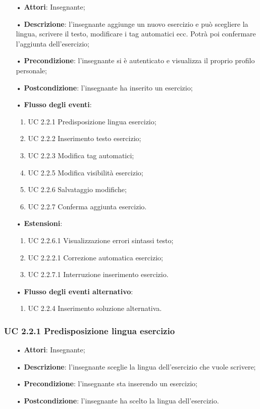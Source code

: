 \begin{itemize}
	\item[•] \textbf{Attori}: Insegnante;
	\item[•] \textbf{Descrizione}: l'insegnante aggiunge un nuovo esercizio e può scegliere la lingua, scrivere il testo,
modificare i tag automatici ecc. Potrà poi confermare l'aggiunta dell'esercizio;
	\item[•] \textbf{Precondizione}: l'insegnante si è autenticato e visualizza il proprio profilo personale;
	\item[•] \textbf{Postcondizione}: l'insegnante ha inserito un esercizio;
	\item[•] \textbf{Flusso degli eventi}:
	\begin{enumerate}
		\item UC 2.2.1 Predisposizione lingua esercizio;
		\item UC 2.2.2 Inserimento testo esercizio;
		\item UC 2.2.3 Modifica tag automatici;

		\item UC 2.2.5 Modifica visibilità esercizio;
		\item UC 2.2.6 Salvataggio modifiche;
		\item UC 2.2.7 Conferma aggiunta esercizio.
	\end{enumerate}
	\item[•] \textbf{Estensioni}:	
	\begin{enumerate}
		\item UC 2.2.6.1 Visualizzazione errori sintassi testo;
		\item UC 2.2.2.1 Correzione automatica esercizio;
		\item UC 2.2.7.1 Interruzione inserimento esercizio.
	\end{enumerate}
	\item[•] \textbf{Flusso degli eventi alternativo}:
	\begin{enumerate}
		\item UC 2.2.4 Inserimento soluzione alternativa.
	\end{enumerate}
\end{itemize}
\subsubsection{UC 2.2.1 Predisposizione lingua esercizio}
\begin{itemize}
	\item[•] \textbf{Attori}: Insegnante;
	\item[•] \textbf{Descrizione}: l'insegnante sceglie la lingua dell’esercizio che vuole scrivere;
	\item[•] \textbf{Precondizione}: l'insegnante sta inserendo un esercizio;
	\item[•] \textbf{Postcondizione}: l'insegnante ha scelto la lingua dell'esercizio.
\end{itemize}

